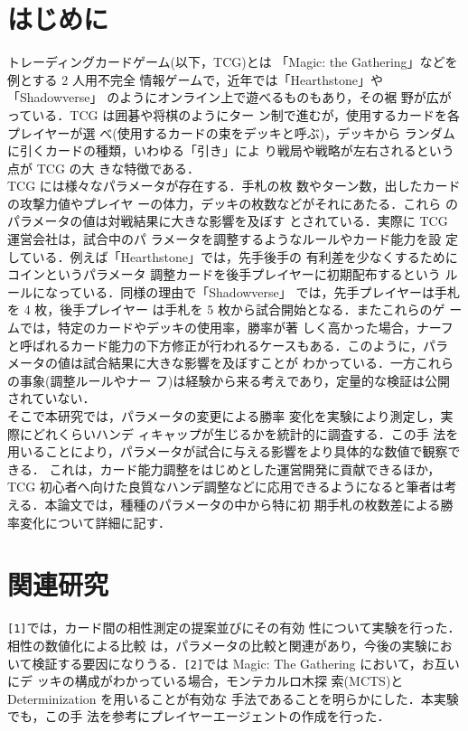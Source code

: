 \documentclass[twocolumn]{ltjsarticle}
\begin{document}
\section{はじめに}
\small{
  トレーディングカードゲーム(以下，TCG)とは
「Magic: the Gathering」などを例とする 2 人用不完全
情報ゲームで，近年では「Hearthstone」や「Shadowverse」
のようにオンライン上で遊べるものもあり，その裾
野が広がっている．TCG は囲碁や将棋のようにター
ン制で進むが，使用するカードを各プレイヤーが選
べ(使用するカードの束をデッキと呼ぶ)，デッキから
ランダムに引くカードの種類，いわゆる「引き」によ
り戦局や戦略が左右されるという点が TCG の大
きな特徴である．
\\TCG には様々なパラメータが存在する．手札の枚
数やターン数，出したカードの攻撃力値やプレイヤ
ーの体力，デッキの枚数などがそれにあたる．これら
のパラメータの値は対戦結果に大きな影響を及ぼす
とされている．実際に TCG 運営会社は，試合中のパ
ラメータを調整するようなルールやカード能力を設
定している．例えば「Hearthstone」では，先手後手の
有利差を少なくするためにコインというパラメータ
調整カードを後手プレイヤーに初期配布するという
ルールになっている．同様の理由で「Shadowverse」
では，先手プレイヤーは手札を 4 枚，後手プレイヤー
は手札を 5 枚から試合開始となる．またこれらのゲ
ームでは，特定のカードやデッキの使用率，勝率が著
しく高かった場合，ナーフと呼ばれるカード能力の下方修正が行われるケースもある．このように，パラ
メータの値は試合結果に大きな影響を及ぼすことが
わかっている．一方これらの事象(調整ルールやナー
フ)は経験から来る考えであり，定量的な検証は公開
されていない．
\\そこで本研究では，パラメータの変更による勝率
変化を実験により測定し，実際にどれくらいハンデ
ィキャップが生じるかを統計的に調査する．この手
法を用いることにより，パラメータが試合に与える影響をより具体的な数値で観察できる．
これは，カード能力調整をはじめとした運営開発に貢献できるほか，
TCG 初心者へ向けた良質なハンデ調整などに応用できるようになると筆者は考
える．本論文では，種種のパラメータの中から特に初
期手札の枚数差による勝率変化について詳細に記す．
}
\section{関連研究}
\small{
  \verb#[1]#では，カード間の相性測定の提案並びにその有効
性について実験を行った．相性の数値化による比較
は，パラメータの比較と関連があり，今後の実験にお
いて検証する要因になりうる．\verb#[2]#では Magic: The Gathering において，お互いにデ
ッキの構成がわかっている場合，モンテカルロ木探
索(MCTS)と Determinization を用いることが有効な
手法であることを明らかにした．本実験でも，この手
法を参考にプレイヤーエージェントの作成を行った．
}
\end{document}
